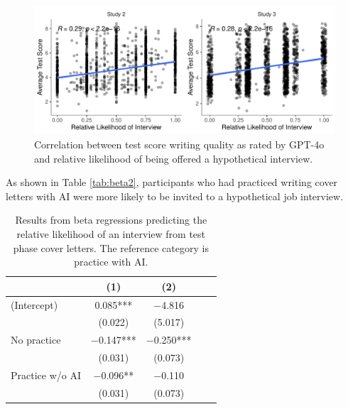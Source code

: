 \documentclass[11pt]{report}
\begin{document}
\begin{append}
\begin{figure}
    \centering
    \includegraphics[width=0.5\linewidth]{correlations2.pdf}
    \caption{Correlation between test score writing quality as rated by GPT-4o and relative likelihood of being offered a hypothetical interview.}
    \label{fig:correlations2}
\end{figure}

As shown in Table \ref{tab:beta2}, participants who had practiced writing cover letters with AI were more likely to be invited to a hypothetical job interview.

\begin{table}[h]
    \centering
    \caption{Results from beta regressions predicting the relative likelihood of an interview from test phase cover letters. The reference category is practice with AI.}

    \begin{tabular}{lcccc}
    \toprule
& (1) & (2)  \\ \midrule 
(Intercept)                                                                      & \num{0.085}***  & \num{-4.816}     \\
& (\num{0.022})   & (\num{5.017})   \\
No practice                                                             & \num{-0.147}*** & \num{-0.250}***  \\
& (\num{0.031})   & (\num{0.073})   \\
Practice w/o AI                                                          & \num{-0.096}**  & \num{-0.110}   \\
& (\num{0.031})   & (\num{0.073})  \\


\end{tabular}
\end{table}
\end{append}
\end{document}
